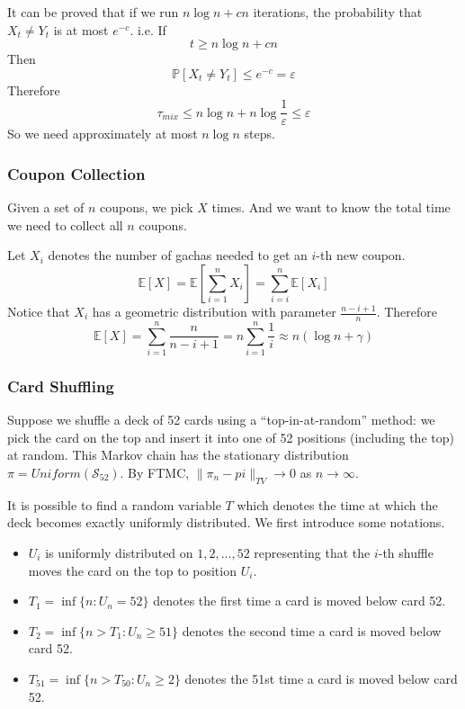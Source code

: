             It can be proved that if we run $n\log n + cn$ iterations, the probability that $X_t \neq Y_t$ is at most $e^{-c}$. i.e.
            If
            \[ t \ge n\log n + cn \]
            Then
            \[ \mathbb{P}[X_t \ne Y_t] \le e^{-c} = \varepsilon \]
            Therefore 
            \[ \tau_{mix} \le n\log n + n\log \frac{1}{\varepsilon} \le \varepsilon\]
            So we need approximately at most $n\log n$ steps.

        \subsubsection{Coupon Collection}
            Given a set of $n$ coupons, we pick $X$ times. And we want to know the total time we need to collect all $n$ coupons.

            Let $X_i$ denotes the number of gachas needed to get an $i$-th new coupon.
            \[ \mathbb{E}[X] = \mathbb{E}[\sum_{i=1}^n X_i] = \sum_{i=i}^n \mathbb{E}[X_i] \]
            Notice that $X_i$ has a geometric distribution with parameter $\frac{n-i+1}{n}$. Therefore
            \[ \mathbb{E}[X] = \sum_{i=1}^n \frac{n}{n-i+1} = n\sum_{i=1}^n \frac{1}{i} \approx n(\log n + \gamma) \]

        \subsubsection{Card Shuffling}
            Suppose we shuffle a deck of 52 cards using a ``top-in-at-random'' method: we pick the card on the top and insert it into one of 52 positions (including the top) at random. This Markov chain has the stationary distribution $\pi = Uniform(\mathcal{S}_{52})$. By FTMC, $\|\pi_n - pi\|_{TV} \to 0$ as $n \to \infty$.

            It is possible to find a random variable $T$ which denotes the time at which the deck becomes exactly uniformly distributed. We first introduce some notations.

            \begin{itemize}
                \item $U_i$ is uniformly distributed on $1,2,\dots,52$ representing that the $i$-th shuffle moves the card on the top to position $U_i$.
                \item $T_1 = \inf\{ n: U_n = 52 \}$ denotes the first time a card is moved below card 52.
                \item $T_2 = \inf\{ n>T_1: U_n \ge 51 \}$ denotes the second time a card is moved below card 52.
                \item $T_{51} = \inf\{ n>T_50: U_n \ge 2 \}$ denotes the 51st time a card is moved below card 52.
            \end{itemize}


